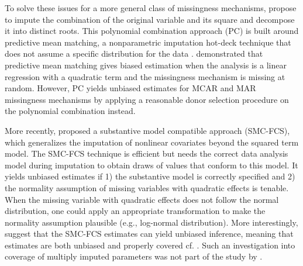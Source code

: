 	To solve these issues for a more general class of missingness mechanisms, \citet{Vink2013} propose to impute the combination of the original variable and its square and decompose it into distinct roots. This polynomial combination approach (PC) is built around predictive mean matching, a nonparametric imputation hot-deck technique that does not assume a specific distribution for the data \citep{rubin1986statistical, little1988missing}. \citet{seaman2012multiple} demonstrated that predictive mean matching gives biased estimation when the analysis is a linear regression with a quadratic term and the missingness mechanism is missing at random. However, PC yields unbiased estimates for MCAR and MAR missingness mechanisms by applying a reasonable donor selection procedure on the polynomial combination instead. 
	
	More recently, \citet{bartlett2015multiple} proposed a substantive model compatible approach (SMC-FCS), which generalizes the imputation of nonlinear covariates beyond the squared term model. The SMC-FCS technique is efficient but needs the correct data analysis model during imputation to obtain draws of values that conform to this model. It yields unbiased estimates if 1) the substantive model is correctly specified and 2) the normality assumption of missing variables with quadratic effects is tenable. When the missing variable with quadratic effects does not follow the normal distribution, one could apply an appropriate transformation to make the normality assumption plausible (e.g., log-normal distribution). More interestingly, \citet{bartlett2015multiple} suggest that the SMC-FCS estimates can yield unbiased inference, meaning that estimates are both unbiased and properly covered cf. \citet{neyman1934two}. Such an investigation into coverage of multiply imputed parameters was not part of the study by \citet{Vink2013}.
	
